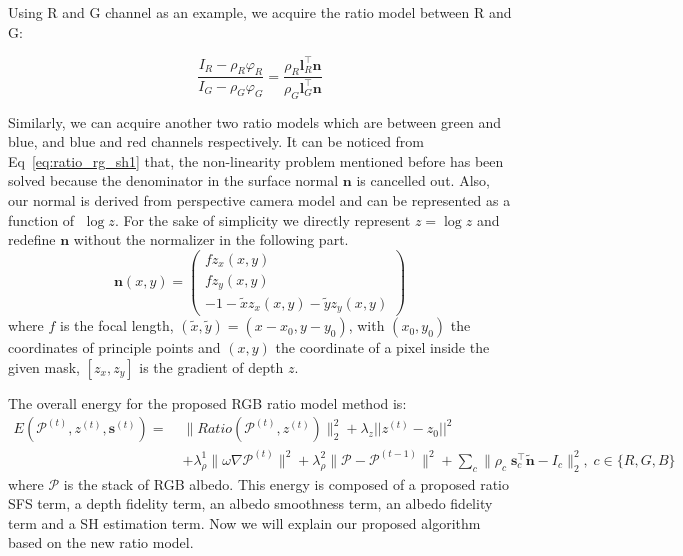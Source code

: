 Using R and G channel as an example, we acquire the ratio model between R and G:

\begin{equation}\label{eq:ratio_rg_sh1}
\frac{I_R - \rho_R \varphi_R}{I_G - \rho_G \varphi_G} = \frac{\rho_R \mathbf{l}_R^\top \mathbf{n}}{\rho_G \mathbf{l}_G^\top \mathbf{n}}
\end{equation}

Similarly, we can acquire another two ratio models which are between green and blue, and blue and red channels respectively.
It can be noticed from Eq~\ref{eq:ratio_rg_sh1} that, the non-linearity problem mentioned before has been solved because the denominator in the surface normal $\mathbf{n}$ is cancelled out.
Also, our normal is derived from perspective camera model and can be represented as a function of $\; \log z$. 
For the sake of simplicity we directly represent $z = \log z$ and redefine $\mathbf{n}$ without the normalizer in the following part.
\begin{equation}\label{eq:ratio_normal}
    \mathbf{n}(x,y) =
     \begin{pmatrix}
         fz_x(x,y)\\
         fz_y(x,y)\\
         -1 - \tilde{x}z_x(x,y) - \tilde{y}z_y(x,y)
     \end{pmatrix}
\end{equation}
where $f$ is the focal length, $(\tilde{x}, \tilde{y}) = (x- x_0, y - y_0)$, with $(x_0, y_0)$ the coordinates of principle points and $(x,y)$ the coordinate of a pixel inside the given mask, $[z_x, z_y]$ is the gradient of depth $z$.

The overall energy for the proposed RGB ratio model method is:
\begin{equation}\label{eq:ratio_energy}
    \begin{split}
    E(\mathcal{P}^{(t)}, z^{(t)}, \mathbf{s}^{(t)}) = \; &\lVert Ratio(\mathcal{P}^{(t)}, z^{(t)}) \rVert^2_2 
    + \lambda_z||z^{(t)} - z_0||^2 \\&
    + \lambda_{\rho}^1 \lVert \omega \nabla \mathcal{P}^{(t)} \rVert^2  
    + \lambda_{\rho}^2 \lVert \mathcal{P} - \mathcal{P}^{(t-1)}\rVert^2 
    + \sum_{c} \lVert \rho_c \; \mathbf{s}_c^\top \tilde{\mathbf{n}} - I_c \rVert^2_2, \; c\in\{R,G,B\}
    \end{split}
\end{equation}
where $\mathcal{P}$ is the stack of RGB albedo.
This energy is composed of a proposed ratio SFS term, a depth fidelity term, an albedo smoothness term, an albedo fidelity term and a SH estimation term.
Now we will explain our proposed algorithm based on the new ratio model.

